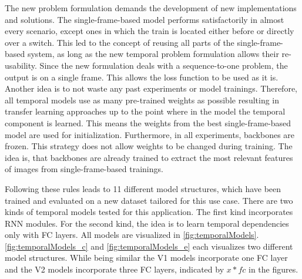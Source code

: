 The new problem formulation demands the development of new implementations and solutions.
The single-frame-based model performs satisfactorily in almost every scenario, except ones in which the train is located either before or directly over a switch.
This led to the concept of reusing all parts of the single-frame-based system, as long as the new temporal problem formulation allows their re-usability.
Since the new formulation deals with a sequence-to-one problem, the output is on a single frame. This allows the loss function to be used as it is.
Another idea is to not waste any past experiments or model trainings.
Therefore, all temporal models use as many pre-trained weights as possible resulting in transfer learning approaches up to the point where in the model the temporal component is learned.
This means the weights from the best single-frame-based model are used for initialization.
Furthermore, in all experiments, backbones are frozen.
This strategy does not allow weights to be changed during training.
The idea is, that backbones are already trained to extract the most relevant features of images from single-frame-based trainings.

Following these rules leads to 11 different model structures, which have been trained and evaluated on a new dataset tailored for this use case.
There are two kinds of temporal models tested for this application.
The first kind incorporates \ac{RNN} modules.
For the second kind, the idea is to learn temporal dependencies only with \ac{FC} layers.
All models are visualized in \autoref{fig:temporalModels}.
\autoref{fig:temporalModels_c} and \autoref{fig:temporalModels_e} each visualizes two different model structures.
While being similar the V1 models incorporate one \ac{FC} layer and the V2 models incorporate three \ac{FC} layers, indicated by $x * fc$ in the figures.


